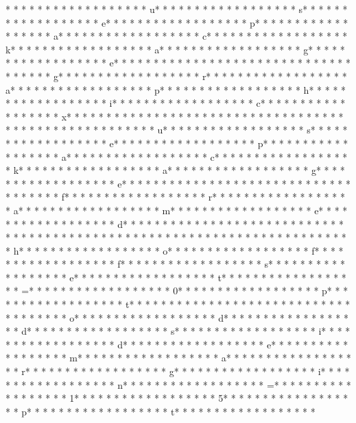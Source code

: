 * * *  * * *  * * *  *  * * *  *  * * *  * u* * *  * * *  * * *  *  * * *  *  * * *  * s* * *  * * *  * * *  *  * * *  *  * * *  * e* * *  * * *  * * *  *  * * *  *  * * *  * p* * *  * * *  * * *  *  * * *  *  * * *  * a* * *  * * *  * * *  *  * * *  *  * * *  * c* * *  * * *  * * *  *  * * *  *  * * *  * k* * *  * * *  * * *  *  * * *  *  * * *  * a* * *  * * *  * * *  *  * * *  *  * * *  * g* * *  * * *  * * *  *  * * *  *  * * *  * e* * *  * * *  * * *  *  * * *  *  * * *  * {* * *  * * *  * * *  *  * * *  *  * * *  * g* * *  * * *  * * *  *  * * *  *  * * *  * r* * *  * * *  * * *  *  * * *  *  * * *  * a* * *  * * *  * * *  *  * * *  *  * * *  * p* * *  * * *  * * *  *  * * *  *  * * *  * h* * *  * * *  * * *  *  * * *  *  * * *  * i* * *  * * *  * * *  *  * * *  *  * * *  * c* * *  * * *  * * *  *  * * *  *  * * *  * x* * *  * * *  * * *  *  * * *  *  * * *  * }* * *  * * *  * * *  *  * * *  *  * * *  * 
* * *  * * *  * * *  *  * * *  *  * * *  * u* * *  * * *  * * *  *  * * *  *  * * *  * s* * *  * * *  * * *  *  * * *  *  * * *  * e* * *  * * *  * * *  *  * * *  *  * * *  * p* * *  * * *  * * *  *  * * *  *  * * *  * a* * *  * * *  * * *  *  * * *  *  * * *  * c* * *  * * *  * * *  *  * * *  *  * * *  * k* * *  * * *  * * *  *  * * *  *  * * *  * a* * *  * * *  * * *  *  * * *  *  * * *  * g* * *  * * *  * * *  *  * * *  *  * * *  * e* * *  * * *  * * *  *  * * *  *  * * *  * {* * *  * * *  * * *  *  * * *  *  * * *  * f* * *  * * *  * * *  *  * * *  *  * * *  * r* * *  * * *  * * *  *  * * *  *  * * *  * a* * *  * * *  * * *  *  * * *  *  * * *  * m* * *  * * *  * * *  *  * * *  *  * * *  * e* * *  * * *  * * *  *  * * *  *  * * *  * d* * *  * * *  * * *  *  * * *  *  * * *  * }* * *  * * *  * * *  *  * * *  *  * * *  * 
* * *  * * *  * * *  *  * * *  *  * * *  * 
* * *  * * *  * * *  *  * * *  *  * * *  * h* * *  * * *  * * *  *  * * *  *  * * *  * o* * *  * * *  * * *  *  * * *  *  * * *  * f* * *  * * *  * * *  *  * * *  *  * * *  * f* * *  * * *  * * *  *  * * *  *  * * *  * s* * *  * * *  * * *  *  * * *  *  * * *  * e* * *  * * *  * * *  *  * * *  *  * * *  * t* * *  * * *  * * *  *  * * *  *  * * *  * =* * *  * * *  * * *  *  * * *  *  * * *  * 0* * *  * * *  * * *  *  * * *  *  * * *  * p* * *  * * *  * * *  *  * * *  *  * * *  * t* * *  * * *  * * *  *  * * *  *  * * *  * 
* * *  * * *  * * *  *  * * *  *  * * *  * o* * *  * * *  * * *  *  * * *  *  * * *  * d* * *  * * *  * * *  *  * * *  *  * * *  * d* * *  * * *  * * *  *  * * *  *  * * *  * s* * *  * * *  * * *  *  * * *  *  * * *  * i* * *  * * *  * * *  *  * * *  *  * * *  * d* * *  * * *  * * *  *  * * *  *  * * *  * e* * *  * * *  * * *  *  * * *  *  * * *  * m* * *  * * *  * * *  *  * * *  *  * * *  * a* * *  * * *  * * *  *  * * *  *  * * *  * r* * *  * * *  * * *  *  * * *  *  * * *  * g* * *  * * *  * * *  *  * * *  *  * * *  * i* * *  * * *  * * *  *  * * *  *  * * *  * n* * *  * * *  * * *  *  * * *  *  * * *  * =* * *  * * *  * * *  *  * * *  *  * * *  * 1* * *  * * *  * * *  *  * * *  *  * * *  * 5* * *  * * *  * * *  *  * * *  *  * * *  * p* * *  * * *  * * *  *  * * *  *  * * *  * t* * *  * * *  * * *  *  * * *  *  * * *  * 
